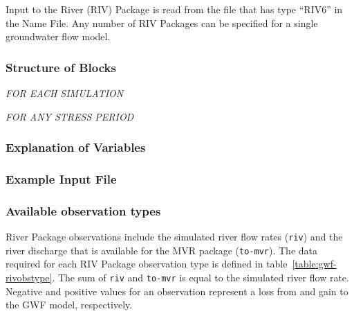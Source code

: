 Input to the River (RIV) Package is read from the file that has type ``RIV6'' in the Name File.  Any number of RIV Packages can be specified for a single groundwater flow model.

\vspace{5mm}
\subsubsection{Structure of Blocks}
\vspace{5mm}

\noindent \textit{FOR EACH SIMULATION}


\vspace{5mm}
\noindent \textit{FOR ANY STRESS PERIOD}

\packageperioddescription

\vspace{5mm}
\subsubsection{Explanation of Variables}
\begin{description}

\end{description}

\vspace{5mm}
\subsubsection{Example Input File}


\vspace{5mm}
\subsubsection{Available observation types}
River Package observations include the simulated river flow rates (\texttt{riv}) and the river discharge that is available for the MVR package (\texttt{to-mvr}). The data required for each RIV Package observation type is defined in table~\ref{table:gwf-rivobstype}. The sum of \texttt{riv} and \texttt{to-mvr} is equal to the simulated river flow rate. Negative and positive values for an observation represent a loss from and gain to the GWF model, respectively.

